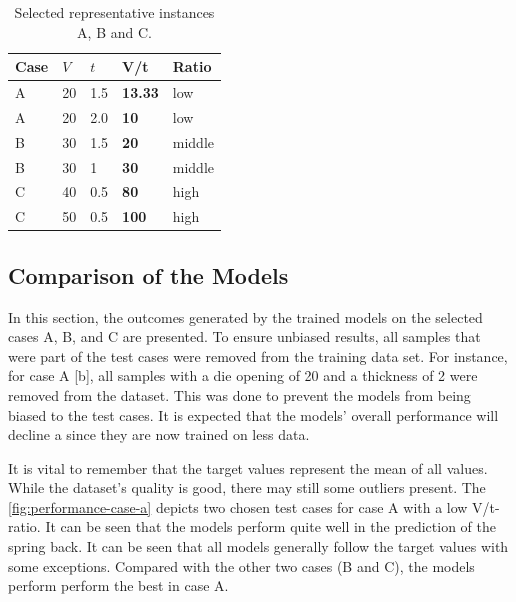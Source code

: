 \begin{table}[h]
    \begin{tcolorbox}[arc=0pt,boxrule=0.5pt]
        \centering
        \begin{tabular}{lllll}
            \toprule
            \textbf{Case} & \textbf{\(V\) } & \textbf{\(t\)} & \textbf{V/t}   & \textbf{Ratio} \\
            \toprule
            A             & 20              & 1.5            & \textbf{13.33} & low            \\
            A             & 20              & 2.0            & \textbf{10}    & low            \\
            \hdashline
            B             & 30              & 1.5            & \textbf{20}    & middle         \\
            B             & 30              & 1              & \textbf{30}    & middle         \\
            \hdashline
            C             & 40              & 0.5            & \textbf{80}    & high           \\
            C             & 50              & 0.5            & \textbf{100}   & high           \\
            \bottomrule
        \end{tabular}
    \end{tcolorbox}
    \caption{Selected representative instances A, B and C.}
    \label{tab:representative-instances}
\end{table}

\subsection{Comparison of the Models}\label{subsec:overall-comparison-model-performance}
In this section, the outcomes generated by the trained models on the selected cases A, B, and C are presented.
To ensure unbiased results, all samples that were part of the test cases were removed from the training data set.
For instance, for case A [b], all samples with a die opening of 20 and a thickness of 2 were removed from the
dataset.
This was done to prevent the models from being biased to the test cases.
It is expected that the models' overall performance will decline a since they are now trained on less data.

It is vital to remember that the target values represent the mean of all values.
While the dataset's quality is good, there may still some outliers present.
The \cref{fig:performance-case-a} depicts two chosen test cases for case A with a low V/t-ratio.
It can be seen that the models perform quite well in the prediction of the spring back.
It can be seen that all models generally follow the target values with some exceptions.
Compared with the other two cases (B and C), the models perform perform the best in case A.

